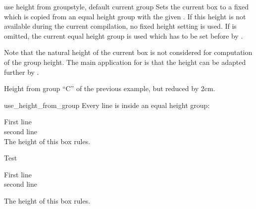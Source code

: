 \clearpage
\begin{docTcbKey}[][doc new and updated={2015-11-27}{2016-02-22}]{use height from group}{}{style, default current group}
  Sets the current box to a fixed  which is copied from
  an equal height group with the given . If this height is not
  available during the current compilation, no fixed height setting is used.
  If  is omitted, the current equal height group is used which has
  to be set before by .\par
  Note that the natural height of the current box is not considered for
  computation of the group height. The main application for
   is that the height can be adapted
  further by .

\begin{dispExample}
\begin{tcolorbox}[use height from group=C,add to height=-2cm,
  colframe=blue!75!black,colback=white]
Height from group \enquote{C} of the previous example, but reduced by 2cm.
\end{tcolorbox}%
\end{dispExample}

\begin{exdispExample}[runs=2]{use_height_from_group}
Every line is inside an equal height group:
\begin{tcbraster}[raster equal height=rows,
    title=Box \thetcbrasternum,
    enhanced,size=small,colframe=red!50!black,colback=red!10!white]
  \begin{tcolorbox}First line\\second line\\
    The height of this box rules.\end{tcolorbox}
  \begin{tcolorbox}Test\end{tcolorbox}
  \begin{tcolorbox}
    First line\\second line\end{tcolorbox}
  \begin{tcolorbox}The height of this box rules.\end{tcolorbox}
\end{tcbraster}
\end{exdispExample}
\end{docTcbKey}



